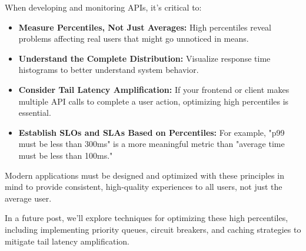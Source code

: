 \documentclass[12pt,letterpaper]{article}
\begin{document}
When developing and monitoring APIs, it's critical to:

\begin{itemize}
    \item \textbf{\textcolor{pythonBlue}{Measure Percentiles, Not Just Averages:}} High percentiles reveal problems affecting real users that might go unnoticed in means.
    
    \item \textbf{\textcolor{pythonBlue}{Understand the Complete Distribution:}} Visualize response time histograms to better understand system behavior.
    
    \item \textbf{\textcolor{pythonBlue}{Consider Tail Latency Amplification:}} If your frontend or client makes multiple API calls to complete a user action, optimizing high percentiles is essential.
    
    \item \textbf{\textcolor{pythonBlue}{Establish SLOs and SLAs Based on Percentiles:}} For example, "p99 must be less than 300ms" is a more meaningful metric than "average time must be less than 100ms."
\end{itemize}

Modern applications must be designed and optimized with these principles in mind to provide consistent, high-quality experiences to all users, not just the average user.

In a future post, we'll explore techniques for optimizing these high percentiles, including implementing priority queues, circuit breakers, and caching strategies to mitigate tail latency amplification.
\end{document}
